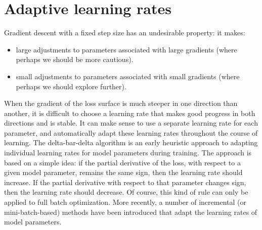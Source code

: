 \section{Adaptive learning rates}
Gradient descent with a fixed step size has an undesirable property: it makes:
\begin{itemize}
    \item large adjustments to parameters associated with large gradients (where perhaps we should be more cautious).

    \item small adjustments to parameters associated with small gradients (where perhaps we should explore further).
\end{itemize}
When the gradient of the loss surface is much steeper in one direction than another, it is difficult to choose a learning rate that makes good progress in both directions and is stable. It can make sense to use a separate learning rate for each parameter, and automatically adapt these learning rates throughout the course of learning.
\newline\newline
The delta-bar-delta algorithm is an early heuristic approach
to adapting individual learning rates for model parameters during training. The approach is based on a simple idea: if the partial derivative of the loss, with respect to a given model parameter, remains the same sign, then the learning rate should increase. If the partial derivative with respect to that parameter changes sign, then the learning rate should decrease. Of course, this kind of rule can only be applied to full batch optimization.\newline\newline
More recently, a number of incremental (or mini-batch-based) methods have been introduced that adapt the learning rates of model parameters.

